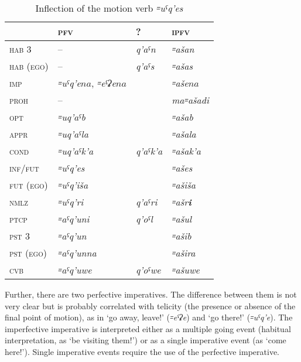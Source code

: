 \documentclass[output=paper]{langsci/langscibook}
\begin{document}
\begin{table}[h]
\caption{Inflection of the motion verb \emph{꞊uˤq'es}}\label{tab:4:19}

\begin{tabular}{@{}lp{}<{\raggedright}ll@{}}
\toprule
& \textsc{pfv} & ? & \textsc{ipfv} \tabularnewline \midrule
  \textsc{hab} 3 & – & \emph{q'aˤn} & \emph{꞊ašan} \tabularnewline
 \textsc{hab (ego)} & –  &  \emph{q'aˤs} & \emph{꞊ašas}\tabularnewline
\textsc{imp} & \emph{꞊uˤq'e\(na\)}, \emph{꞊eˤʡe\(na\)} &  & \emph{꞊aše\(na\)}\tabularnewline
\textsc{proh} & – & & \emph{ma꞊ašadi}\tabularnewline
\textsc{opt} & \emph{꞊uq'aˤb} & & \emph{꞊ašab}\tabularnewline
\textsc{appr} & \emph{꞊uq'aˤla} & & \emph{꞊ašala}\tabularnewline
\textsc{cond} & \emph{꞊uq'aˤk'a} & \emph{q'aˤk'a} & \emph{꞊ašak'a}\tabularnewline
\textsc{inf}/\textsc{fut} & \emph{꞊uˤq'es} & & \emph{꞊ašes}\tabularnewline
\textsc{fut (ego)} & \emph{꞊uˤq'iša} & & \emph{꞊ašiša}\tabularnewline
\textsc{nmlz} & \emph{꞊uˤq'ri} & \emph{q'aˤri} &
\emph{꞊ašr\textbf{i}}\tabularnewline
\textsc{ptcp} & \emph{꞊aˤq'uni} & \emph{q'oˤl} & \emph{꞊ašul}\tabularnewline
\textsc{pst} 3 & \emph{꞊aˤq'un} & & \emph{꞊ašib} \tabularnewline
\textsc{pst (ego)} & \emph{꞊aˤq'unna} &  & \emph{꞊ašira}\tabularnewline
\textsc{cvb} & \emph{꞊aˤq'uwe} & \emph{q'oˤwe} & \emph{꞊ašuwe}\tabularnewline
\bottomrule
\end{tabular}
\end{table}

\pagebreak

Further, there are two perfective imperatives. The difference between
them is not very clear but is probably correlated with telicity (the
presence or absence of the final point of motion), as in `go away,
leave!' (\emph{꞊eˤʡe}) and `go there!' (\emph{꞊uˤq'e}). The imperfective
imperative is interpreted either as a multiple going event (habitual
interpretation, as `be visiting them!') or as a single 
imperative event (as `come here!'). Single  imperative events
require the use of the perfective imperative.
\end{document}
